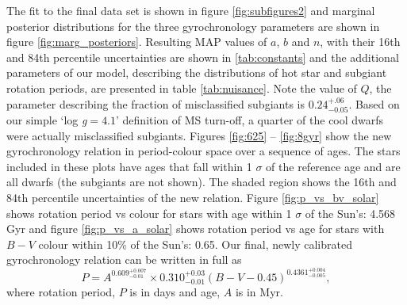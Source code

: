 \documentclass[11pt,preprint]{aastex}
\newcommand{\logg}{log \emph{g}}
\newcommand{\gyroa}{0.310}
\newcommand{\aerrp}{0.03}
\newcommand{\aerrm}{0.01}
\newcommand{\gyron}{0.609}
\newcommand{\nerrp}{0.007}
\newcommand{\nerrm}{0.01}
\newcommand{\gyrob}{0.4361}
\newcommand{\berrp}{0.004}
\newcommand{\berrm}{0.005}
\begin{document}
The fit to the final data set is shown in figure \ref{fig:subfigures2} and marginal posterior distributions for the three gyrochronology parameters are shown in figure \ref{fig:marg_posteriors}.
Resulting MAP values of $a$, $b$ and $n$, with their 16th and 84th percentile uncertainties are shown in \ref{tab:constants} and the additional parameters of our model, describing the distributions of hot star and subgiant rotation periods, are presented in table \ref{tab:nuisance}.
Note the value of $Q$, the parameter describing the fraction of misclassified subgiants is $0.24^{+.06}_{-0.05}$.
Based on our simple `\logg$=4.1$' definition of MS turn-off, a quarter of the cool dwarfs were actually misclassified subgiants.
Figures \ref{fig:625} -- \ref{fig:8gyr} show the new gyrochronology relation in period-colour space over a sequence of ages.
The stars included in these plots have ages that fall within 1 $\sigma$ of the reference age and are all dwarfs (the subgiants are not shown).
The shaded region shows the 16th and 84th percentile uncertainties of the new relation.
Figure \ref{fig:p_vs_bv_solar} shows rotation period vs colour for stars with age within 1 $\sigma$ of the Sun's: 4.568 Gyr and figure \ref{fig:p_vs_a_solar} shows rotation period vs age for stars with $B-V$ colour within 10\% of the Sun's: 0.65.
Our final, newly calibrated gyrochronology relation can be written in full as
\begin{equation}
	P = A^{\gyron^{+\nerrp}_{-\nerrm}} \times \gyroa^{+\aerrp}_{-\aerrm}(B-V-0.45)^{\gyrob^{+\berrp}_{-\berrm}},
\label{eq:Barnes2007_3}
\end{equation}
where rotation period, $P$ is in days and age, $A$ is in Myr.
\end{document}
